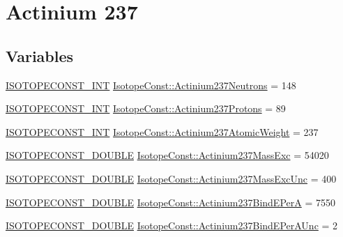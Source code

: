 \hypertarget{group___isotope_const-_actinium-_ac237}{}\section{Actinium 237}
\label{group___isotope_const-_actinium-_ac237}
\subsection*{Variables}
\begin{DoxyCompactItemize}
\item 
\mbox{\hyperlink{group___isotope_const-_macros_ga5f18360b3e99483a35c32d789e62621c}{I\+S\+O\+T\+O\+P\+E\+C\+O\+N\+S\+T\+\_\+\+I\+NT}} \mbox{\hyperlink{group___isotope_const-_actinium-_ac237_gabcc08affae54df0adcba2fae9476695b}{Isotope\+Const\+::\+Actinium237\+Neutrons}} = 148
\item 
\mbox{\hyperlink{group___isotope_const-_macros_ga5f18360b3e99483a35c32d789e62621c}{I\+S\+O\+T\+O\+P\+E\+C\+O\+N\+S\+T\+\_\+\+I\+NT}} \mbox{\hyperlink{group___isotope_const-_actinium-_ac237_ga7690b529e765c47811ba0a257a4f3b56}{Isotope\+Const\+::\+Actinium237\+Protons}} = 89
\item 
\mbox{\hyperlink{group___isotope_const-_macros_ga5f18360b3e99483a35c32d789e62621c}{I\+S\+O\+T\+O\+P\+E\+C\+O\+N\+S\+T\+\_\+\+I\+NT}} \mbox{\hyperlink{group___isotope_const-_actinium-_ac237_ga71b80083718b27a493a9bfe84da0d33b}{Isotope\+Const\+::\+Actinium237\+Atomic\+Weight}} = 237
\item 
\mbox{\hyperlink{group___isotope_const-_macros_ga8f45a7272ce02c0b4c65c44636ed719a}{I\+S\+O\+T\+O\+P\+E\+C\+O\+N\+S\+T\+\_\+\+D\+O\+U\+B\+LE}} \mbox{\hyperlink{group___isotope_const-_actinium-_ac237_ga20e5fcc35e02d4f08656b660d8d93079}{Isotope\+Const\+::\+Actinium237\+Mass\+Exc}} = 54020
\item 
\mbox{\hyperlink{group___isotope_const-_macros_ga8f45a7272ce02c0b4c65c44636ed719a}{I\+S\+O\+T\+O\+P\+E\+C\+O\+N\+S\+T\+\_\+\+D\+O\+U\+B\+LE}} \mbox{\hyperlink{group___isotope_const-_actinium-_ac237_ga05f73d9a966f2ba48b7ecae44879cc84}{Isotope\+Const\+::\+Actinium237\+Mass\+Exc\+Unc}} = 400
\item 
\mbox{\hyperlink{group___isotope_const-_macros_ga8f45a7272ce02c0b4c65c44636ed719a}{I\+S\+O\+T\+O\+P\+E\+C\+O\+N\+S\+T\+\_\+\+D\+O\+U\+B\+LE}} \mbox{\hyperlink{group___isotope_const-_actinium-_ac237_gae43f74f428eb678b223bb2fdccda66bb}{Isotope\+Const\+::\+Actinium237\+Bind\+E\+PerA}} = 7550
\item 
\mbox{\hyperlink{group___isotope_const-_macros_ga8f45a7272ce02c0b4c65c44636ed719a}{I\+S\+O\+T\+O\+P\+E\+C\+O\+N\+S\+T\+\_\+\+D\+O\+U\+B\+LE}} \mbox{\hyperlink{group___isotope_const-_actinium-_ac237_ga6e4e9c058d54e1d65fb3e623eb70caab}{Isotope\+Const\+::\+Actinium237\+Bind\+E\+Per\+A\+Unc}} = 2

\end{DoxyCompactItemize}
